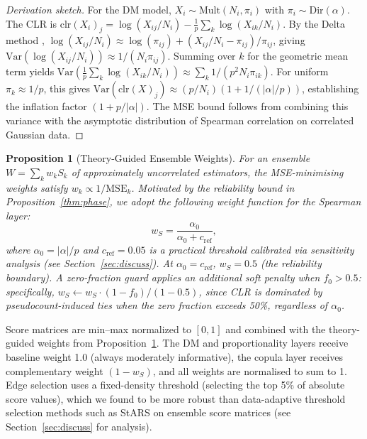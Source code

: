\documentclass[unnumsec,webpdf,contemporary,large,numbered]{oup-authoring-template}
\theoremstyle{plain}
\newtheorem{proposition}[theorem]{Proposition}
\theoremstyle{definition}
\newcommand{\Var}{\mathrm{Var}}
\begin{document}
\begin{proof}[Derivation sketch]
For the DM model, $X_i \sim \text{Mult}(N_i, \pi_i)$ with $\pi_i \sim \text{Dir}(\alpha)$. The CLR is $\text{clr}(X_i)_j = \log(X_{ij}/N_i) - \frac{1}{p}\sum_k \log(X_{ik}/N_i)$. By the Delta method \cite{aitchison1986}, $\log(X_{ij}/N_i) \approx \log(\pi_{ij}) + (X_{ij}/N_i - \pi_{ij})/\pi_{ij}$, giving $\Var(\log(X_{ij}/N_i)) \approx 1/(N_i \pi_{ij})$. Summing over $k$ for the geometric mean term yields $\Var(\frac{1}{p}\sum_k \log(X_{ik}/N_i)) \approx \sum_k 1/(p^2 N_i \pi_{ik})$. For uniform $\pi_k \approx 1/p$, this gives $\Var(\text{clr}(X)_j) \approx (p/N_i)(1 + 1/(|\alpha|/p))$, establishing the inflation factor $(1 + p/|\alpha|)$. The MSE bound follows from combining this variance with the asymptotic distribution of Spearman correlation on correlated Gaussian data.
\end{proof}

\begin{proposition}[Theory-Guided Ensemble Weights]\label{thm:weights}
For an ensemble $W = \sum_k w_k S_k$ of approximately uncorrelated estimators, the MSE-minimising weights satisfy $w_k \propto 1/\text{MSE}_k$. Motivated by the reliability bound in Proposition~\ref{thm:phase}, we adopt the following weight function for the Spearman layer:
\begin{equation}
w_S = \frac{\alpha_0}{\alpha_0 + c_{\text{ref}}},
\end{equation}
where $\alpha_0 = |\alpha|/p$ and $c_{\text{ref}} = 0.05$ is a practical threshold calibrated via sensitivity analysis (see Section~\ref{sec:discuss}). At $\alpha_0 = c_{\text{ref}}$, $w_S = 0.5$ (the reliability boundary). A zero-fraction guard applies an additional soft penalty when $f_0 > 0.5$: specifically, $w_S \leftarrow w_S \cdot (1 - f_0)/(1 - 0.5)$, since CLR is dominated by pseudocount-induced ties when the zero fraction exceeds 50\%, regardless of $\alpha_0$.
\end{proposition}

Score matrices are min--max normalized to $[0,1]$ and combined with the theory-guided weights from Proposition~\ref{thm:weights}. The DM and proportionality layers receive baseline weight 1.0 (always moderately informative), the copula layer receives complementary weight $(1 - w_S)$, and all weights are normalised to sum to 1. Edge selection uses a fixed-density threshold (selecting the top 5\% of absolute score values), which we found to be more robust than data-adaptive threshold selection methods such as StARS \cite{liu2010} on ensemble score matrices (see Section~\ref{sec:discuss} for analysis).
\end{document}
